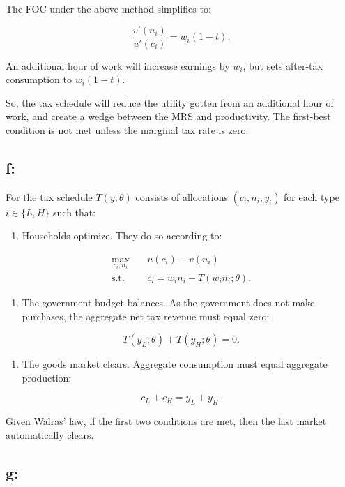 \documentclass[
  letterpaper,
  DIV=11,
  numbers=noendperiod]{scrartcl}
\providecommand{\tightlist}{%
  \setlength{\itemsep}{0pt}\setlength{\parskip}{0pt}}
\begin{document}
The FOC under the above method simplifies to:

\[
\frac{v'(n_i)}{u'(c_i)}=w_i(1-t).
\]

An additional hour of work will increase earnings by \(w_i\), but sets
after-tax consumption to \(w_i(1-t)\).

So, the tax schedule will reduce the utility gotten from an additional
hour of work, and create a wedge between the MRS and productivity. The
first-best condition is not met unless the marginal tax rate is zero.

\subsection{f:}\label{f}

For the tax schedule \(T(y;\theta)\) consists of allocations
\((c_i,n_i,y_i)\) for each type \(i\in\{L,H\}\) such that:

\begin{enumerate}
\def\labelenumi{\arabic{enumi}.}
\tightlist
\item
  Households optimize. They do so according to:
\end{enumerate}

\[
\begin{aligned}
\max_{c_i,n_i}\quad
&u(c_i)-v(n_i)\\
\text{s.t.}\quad
&c_i=w_i n_i-T(w_i n_i;\theta).
\end{aligned}
\]

\begin{enumerate}
\def\labelenumi{\arabic{enumi}.}
\setcounter{enumi}{1}
\tightlist
\item
  The government budget balances. As the government does not make
  purchases, the aggregate net tax revenue must equal zero:
\end{enumerate}

\[
T(y_L;\theta)+T(y_H;\theta)=0.
\]

\begin{enumerate}
\def\labelenumi{\arabic{enumi}.}
\setcounter{enumi}{2}
\tightlist
\item
  The goods market clears. Aggregate consumption must equal aggregate
  production:
\end{enumerate}

\[
c_L+c_H=y_L+y_H.
\]

Given Walras' law, if the first two conditions are met, then the last
market automatically clears.

\subsection{g:}\label{g}
\end{document}
